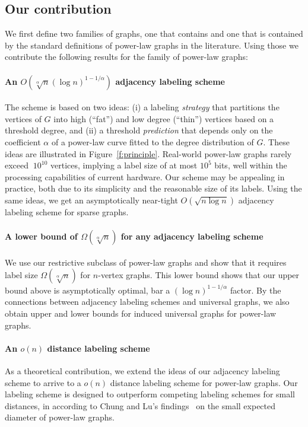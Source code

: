 \subsection{Our contribution}
We first define two families of graphs, one that  contains and one that is contained by the standard definitions of power-law graphs in the literature.
Using those we contribute the following results for the family of power-law graphs:

\paragraph{An  $O(\sqrt[\alpha] n (\log n)^{1 - 1/\alpha})$ adjacency labeling scheme}
The scheme is based on two ideas:
(i) a labeling \emph{strategy} that  partitions the vertices of $G$ into high (``fat'') and low degree (``thin'') vertices based on a threshold degree, and (ii) a threshold \emph{prediction} that depends only on the coefficient $\alpha$ of a power-law curve fitted to the degree distribution of $G$.  These ideas are illustrated in Figure~\ref{f:principle}.
Real-world power-law graphs rarely exceed  $~10^{10}$ vertices, implying a label size of at most  ${10^{5}}$ bits, well within the processing capabilities of current hardware. 
Our  scheme may be appealing in practice,  both due  to its simplicity and the reasonable size of its labels.
Using the same ideas, we get an  asymptotically near-tight  $O(\sqrt{n \log n})$ adjacency labeling scheme for sparse graphs.

\paragraph{A lower bound of $\Omega(\sqrt[\alpha]{n})$ for any adjacency labeling scheme}
We use our  restrictive subclass of power-law graphs and  show that it requires label size $\Omega(\sqrt[\alpha]{n})$ for $n$-vertex graphs.
This lower bound shows that our upper bound above is asymptotically  optimal, bar a $(\log n)^{1 - 1/\alpha}$ factor.
By the connections between adjacency labeling schemes and universal graphs, we also obtain upper and lower bounds for induced universal graphs for power-law graphs. 

\paragraph{An $o(n)$ distance labeling scheme}
As a theoretical contribution, we extend the ideas of our  adjacency labeling scheme to arrive to a $o(n)$ distance labeling scheme for power-law graphs.
Our labeling scheme is designed to outperform competing labeling schemes for small distances, in according to Chung and Lu's findings~\cite{chung2004average} on the small expected diameter of power-law graphs.

